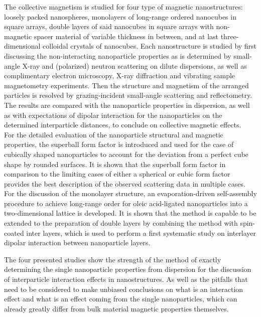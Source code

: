 \documentclass[\main/dresen_thesis.tex]{subfiles}
\begin{document}
  The collective magnetism is studied for four type of magnetic nanostructures: loosely packed nanospheres, monolayers of long-range ordered nanocubes in square arrays, double layers of said nanocubes in square arrays with non-magnetic spacer material of variable thickness in between, and at last three-dimensional colloidal crystals of nanocubes.
  Each nanostructure is studied by first discussing the non-interacting nanoparticle properties as is determined by small-angle X-ray and (polarized) neutron scattering on dilute dispersions, as well as complimentary electron microscopy, X-ray diffraction and vibrating sample magnetometry experiments.
  Then the structure and magnetism of the arranged particles is resolved by grazing-incident small-angle scattering and reflectometry.
  The results are compared with the nanoparticle properties in dispersion, as well as with expectations of dipolar interaction for the nanoparticles on the determined interparticle distances, to conclude on collective magnetic effects.
  \\

  For the detailed evaluation of the nanoparticle structural and magnetic properties, the superball form factor is introduced and used for the case of cubically shaped nanoparticles to account for the deviation from a perfect cube shape by rounded surfaces.
  It is shown that the superball form factor in comparison to the limiting cases of either a spherical or cubic form factor provides the best description of the observed scattering data in multiple cases.
  For the discussion of the monolayer structure, an evaporation-driven self-assembly procedure to achieve long-range order for oleic acid-ligated nanoparticles into a two-dimensional lattice is developed.
  It is shown that the method is capable to be extended to the preparation of double layers by combining the method with spin-coated inter layers, which is used to perform a first systematic study on interlayer dipolar interaction between nanoparticle layers.

  The four presented studies show the strength of the method of exactly determining the single nanoparticle properties from dispersion for the discussion of interparticle interaction effects in nanostructures.
  As well as the pitfalls that need to be considered to make unbiased conclusions on what is an interaction effect and what is an effect coming from the single nanoparticles, which can already greatly differ from bulk material magnetic properties themselves.
\end{document}
